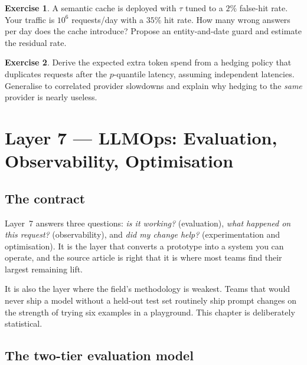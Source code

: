 \documentclass[11pt,twoside,openright]{book}
\theoremstyle{definition}
\newtheorem{exercise}{Exercise}[chapter]
\theoremstyle{plain}
\theoremstyle{remark}
\begin{document}
\begin{exercise}
A semantic cache is deployed with $\tau$ tuned to a $2\%$ false-hit rate. Your
traffic is $10^{6}$ requests/day with a $35\%$ hit rate. How many wrong answers
per day does the cache introduce? Propose an entity-and-date guard and estimate
the residual rate.
\end{exercise}

\begin{exercise}
Derive the expected extra token spend from a hedging policy that duplicates
requests after the $p$-quantile latency, assuming independent latencies.
Generalise to correlated provider slowdowns and explain why hedging to the
\emph{same} provider is nearly useless.
\end{exercise}

\cleardoublepage

\chapter{Layer 7 --- LLMOps: Evaluation, Observability, Optimisation}
\label{ch:llmops}

\section{The contract}

Layer~7 answers three questions: \emph{is it working?} (evaluation),
\emph{what happened on this request?} (observability), and \emph{did my change
help?} (experimentation and optimisation). It is the layer that converts a
prototype into a system you can operate, and the source article is right that it
is where most teams find their largest remaining lift.

It is also the layer where the field's methodology is weakest. Teams that would
never ship a model without a held-out test set routinely ship prompt changes on
the strength of trying six examples in a playground. This chapter is
deliberately statistical.

\section{The two-tier evaluation model}
\end{document}
